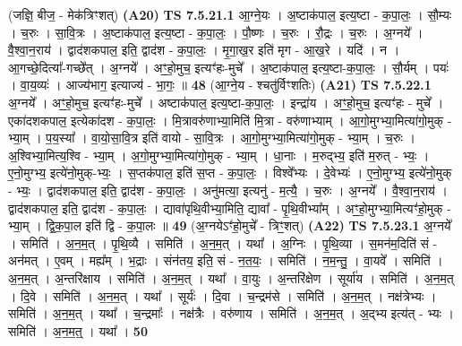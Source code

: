 \documentclass[17pt]{extarticle}
\begin{document}
                  \newline
                      (जज्ञि॒ बीज॒ - मेक॑त्रिꣳशत्)  \textbf{(A20)} \newline \newline
                                \textbf{ TS 7.5.21.1} \newline
                  आ॒ग्ने॒यः । अ॒ष्टाक॑पाल॒ इत्य॒ष्टा - क॒पा॒लः॒ । सौ॒म्यः । च॒रुः । सा॒वि॒त्रः । अ॒ष्टाक॑पाल॒ इत्य॒ष्टा - क॒पा॒लः॒ । पौ॒ष्णः । च॒रुः । रौ॒द्रः । च॒रुः । अ॒ग्नये᳚ । वै॒श्वा॒न॒राय॑ । द्वाद॑शकपाल॒ इति॒ द्वाद॑श - क॒पा॒लः॒ । मृ॒गा॒ख॒र इति॑ मृग - आ॒ख॒रे । यदि॑ । न । आ॒गच्छे॒दित्या᳚-गच्छे᳚त् । अ॒ग्नये᳚ । अꣳ॒॒हो॒मुच॒ इत्यꣳ॑हः-मुचे᳚ । अ॒ष्टाक॑पाल॒ इत्य॒ष्टा-क॒पा॒लः॒ । सौ॒र्यम् । पयः॑ । वा॒य॒व्यः॑ । आज्य॑भाग॒ इत्याज्य॑ - भा॒गः॒ ॥ \textbf{  48} \newline
                  \newline
                      (आ॒ग्ने॒य - श्चतु॑र्विꣳशतिः)  \textbf{(A21)} \newline \newline
                                \textbf{ TS 7.5.22.1} \newline
                  अ॒ग्नये᳚ । अꣳ॒॒हो॒मुच॒ इत्यꣳ॑हः-मुचे᳚ । अष्टाक॑पाल॒ इत्य॒ष्टा-क॒पा॒लः॒ । इन्द्रा॑य । अꣳ॒॒हो॒मुच॒ इत्यꣳ॑हः - मुचे᳚ । एका॑दशकपाल॒ इत्येका॑दश - क॒पा॒लः॒ । मि॒त्रावरु॑णाभ्या॒मिति॑ मि॒त्रा - वरु॑णाभ्याम् । आ॒गो॒मुग्भ्या॒मित्या॑गो॒मुक् - भ्या॒म् । प॒य॒स्या᳚ । वा॒यो॒सा॒वि॒त्र इति॑ वायो - सा॒वि॒त्रः । आ॒गो॒मुग्भ्या॒मित्या॑गो॒मुक् - भ्या॒म् । च॒रुः । अ॒श्विभ्या॒मित्य॒श्वि - भ्या॒म् । अ॒गो॒मुग्भ्या॒मित्या॑गो॒मुक् - भ्या॒म् । धा॒नाः । म॒रुद्भ्य॒ इति॑ म॒रुत् - भ्यः॒ । ए॒नो॒मुग्भ्य॒ इत्ये॑नो॒मुक्-भ्यः॒ । स॒प्तक॑पाल॒ इति॑ स॒प्त - क॒पा॒लः॒ । विश्वे᳚भ्यः । दे॒वेभ्यः॑ । ए॒नो॒मुग्भ्य॒ इत्ये॑नो॒मुक् - भ्यः॒ । द्वाद॑शकपाल॒ इति॒ द्वाद॑श - क॒पा॒लः॒ । अनु॑मत्या॒ इत्यनु॑ - म॒त्यै॒ । च॒रुः । अ॒ग्नये᳚ । वै॒श्वा॒न॒राय॑ । द्वाद॑शकपाल॒ इति॒ द्वाद॑श - क॒पा॒लः॒ । द्यावा॑पृथि॒वीभ्या॒मिति॒ द्यावा᳚ - पृ॒थि॒वीभ्या᳚म् । अꣳ॒॒हो॒मुग्भ्या॒मित्यꣳ॑हो॒मुक् - भ्या॒म् । द्वि॒क॒पा॒ल इति॑ द्वि - क॒पा॒लः ॥ \textbf{  49} \newline
                  \newline
                      (अ॒ग्नयेऽꣳ॑हो॒मुचे᳚ - त्रिꣳ॒॒शत्)  \textbf{(A22)} \newline \newline
                                \textbf{ TS 7.5.23.1} \newline
                  अ॒ग्नये᳚ । समिति॑ । अ॒न॒म॒त् । पृ॒थि॒व्यै । समिति॑ । अ॒न॒म॒त् । यथा᳚ । अ॒ग्निः । पृ॒थि॒व्या । स॒मन॑म॒दिति॑ सं - अन॑मत् । ए॒वम् । मह्य᳚म् । भ॒द्राः । संन॑तय॒ इति॒ सं - न॒त॒यः॒ । समिति॑ । न॒म॒न्तु॒ । वा॒यवे᳚ । समिति॑ । अ॒न॒म॒त् । अ॒न्तरि॑क्षाय । समिति॑ । अ॒न॒म॒त् । यथा᳚ । वा॒युः । अ॒न्तरि॑क्षेण । सूर्या॑य । समिति॑ । अ॒न॒म॒त् । दि॒वे । समिति॑ । अ॒न॒म॒त् । यथा᳚ । सूर्यः॑ । दि॒वा । च॒न्द्रम॑से । समिति॑ । अ॒न॒म॒त् । नक्ष॑त्रेभ्यः । समिति॑ । अ॒न॒म॒त् । यथा᳚ । च॒न्द्रमाः᳚ । नक्ष॑त्रैः । वरु॑णाय । समिति॑ । अ॒न॒म॒त् । अ॒द्भ्य इत्य॑त् - भ्यः । समिति॑ । अ॒न॒म॒त्॒ । यथा᳚ । \textbf{  50} \newline
\end{document}
